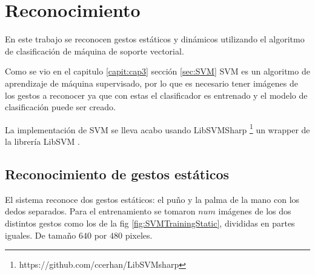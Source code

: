 \section{Reconocimiento}\label{sec:ReconocimientoSystem}

En este trabajo se reconocen gestos estáticos y dinámicos utilizando el algoritmo de clasificación de máquina de soporte vectorial.  

Como se vio en el capitulo \ref{capit:cap3} sección \ref{sec:SVM} SVM es un algoritmo de aprendizaje de máquina supervisado, por lo que es necesario tener imágenes de los gestos a reconocer ya que con estas el clasificador es entrenado y el modelo de clasificación puede ser creado. 

La implementación de SVM se lleva acabo usando LibSVMSharp \footnote{https://github.com/ccerhan/LibSVMsharp} un wrapper de la librería LibSVM \citep{Chang2011}.

\subsection{Reconocimiento de gestos estáticos}\label{RecognitionEstatic}

El sistema reconoce dos gestos estáticos: el puño y la palma de la mano con los dedos separados.  Para el entrenamiento se tomaron $num$ imágenes de los dos distintos gestos como los de la fig \ref{fig:SVMTrainingStatic}, divididas en partes iguales. De tamaño $640$ por $480$ pixeles.   

